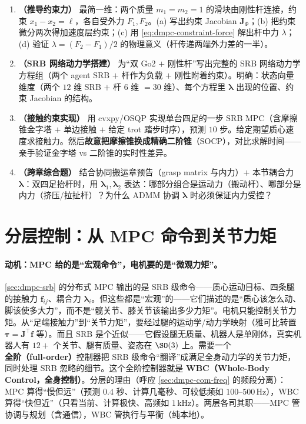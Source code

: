 \begin{exercise}
\begin{enumerate}
  \item \textbf{（推导约束力）} 最简一维：两个质量 $m_1=m_2=1$ 的滑块由刚性杆连接，约束 $x_1-x_2=\ell$，各自受外力 $F_1,F_2$。(a) 写出约束 Jacobian $\mathbf{J}_\Phi$；(b) 把约束微分两次得加速度层约束；(c) 用 \cref{eq:dmpc-constraint-force} 解出杆中力 $\lambda$；(d) 验证 $\lambda=(F_2-F_1)/2$ 的物理意义（杆传递两端外力差的一半）。
  \item \textbf{（SRB 网络动力学搭建）} 为“双 Go2 $+$ 刚性杆”写出完整的 SRB 网络动力学方程组（两个 agent SRB $+$ 杆作为负载 $+$ 刚性附着约束）。明确：状态向量维度（两个 $12$ 维 SRB $+$ 杆 $6$ 维 $=30$ 维）、每个方程里 $\boldsymbol{\lambda}$ 出现的位置、约束 Jacobian 的结构。
  \item \textbf{（接触约束实现）} 用 cvxpy/OSQP 实现单台四足的一步 SRB MPC（含摩擦锥金字塔 $+$ 单边接触 $+$ 给定 trot 踏步时序），预测 $10$ 步。给定期望质心速度求接触力。然后\textbf{故意把摩擦锥换成精确二阶锥}（SOCP），对比求解时间——亲手验证金字塔 vs 二阶锥的实时性差异。
  \item \textbf{（跨章综合题）} 结合协同搬运章预告（grasp matrix 与内力）$+$ 本节耦合力 $\boldsymbol{\lambda}$：双四足抬杆时，用 $\boldsymbol{\lambda}_1,\boldsymbol{\lambda}_2$ 表达：哪部分组合是运动力（搬动杆）、哪部分是内力（挤压/拉扯杆）？为什么 ADMM 协调 $\boldsymbol{\lambda}$ 时必须保证内力受控？
\end{enumerate}
\end{exercise}

\section{分层控制：从 MPC 命令到关节力矩}
\label{sec:dmpc-layered}

\paragraph{动机：MPC 给的是“宏观命令”，电机要的是“微观力矩”。}
\cref{sec:dmpc-srb} 的分布式 MPC 输出的是 SRB 级命令——质心运动目标、四条腿的接触力 $\mathbf{f}_{ij}$、耦合力 $\boldsymbol{\lambda}_i$。但这些都是“宏观”的——它们描述的是“质心该怎么动、脚该使多大力”，而不是“髋关节、膝关节该输出多少力矩”。电机只能控制关节力矩。从“足端接触力”到“关节力矩”，要经过腿的运动学/动力学映射（雅可比转置 $\boldsymbol{\tau}=\mathbf{J}^\top\mathbf{f}$ 等）。而且 SRB 是个近似——它假设腿无质量、机器人是单刚体，真实机器人有 $12+$ 个关节、腿有质量、姿态在 $\SO(3)$ 上。需要一个\textbf{全阶（full-order）}控制器把 SRB 级命令“翻译”成满足全身动力学的关节力矩，同时处理 SRB 忽略的细节。这个全阶控制器就是 \textbf{WBC（Whole-Body Control，全身控制）}。分层的理由（呼应 \cref{sec:dmpc-com-freq} 的频段分离）：MPC 算得“慢但远”（预测 $0.4$ 秒、计算几毫秒、可较低频如 $100$–$500$\,Hz），WBC 算得“快但近”（只看当前、计算极快、高频如 $1$\,kHz）。两层各司其职——MPC 管协调与规划（含通信），WBC 管执行与平衡（纯本地）。


